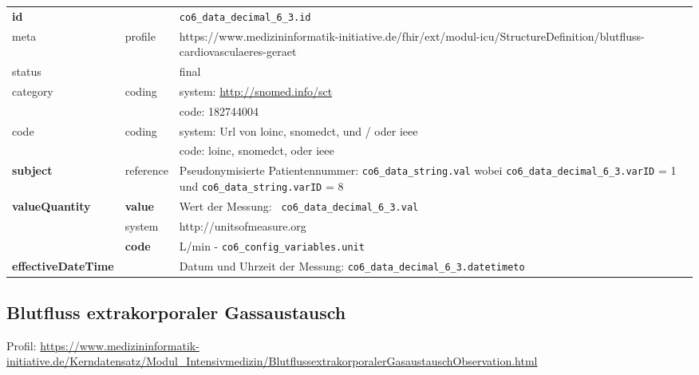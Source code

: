 \begin{longtable}{|l|l|p{7.5cm}|}
        \hline
        \rowcolor{lightgray} \multicolumn{3}{|l|}{Data Mapping (inhaltlich)} \\ \hline
        \textbf{id} &  & \texttt{co6\_data\_decimal\_6\_3.id} \\ \hline
	meta & profile & https://www.medizininformatik-initiative.de/fhir/ext/modul-icu/StructureDefinition/blutfluss-cardiovasculaeres-geraet \\ \hline 
	status &  & final   \\ \hline 
	category & coding & system: \url{http://snomed.info/sct} \\
\cline{3-3}
	& & code: 182744004 \\ \hline
	code & coding & system: Url von \ac{loinc}, \ac{snomedct}, und / oder \ac{ieee} \\ 
	\cline{3-3} 
	 &  & code: \ac{loinc}, \ac{snomedct}, oder \ac{ieee} \\ \hline
	 \textbf{subject} & reference & Pseudonymisierte Patientennummer: \texttt{co6\_data\_string.val} wobei \texttt{co6\_data\_decimal\_6\_3.varID} = 1 und \texttt{co6\_data\_string.varID} = 8 \\ \hline
	 \textbf{valueQuantity}  & \textbf{value} & Wert der Messung: \texttt{
co6\_data\_decimal\_6\_3.val} \\
        \cline{2-3}
         & system & http://unitsofmeasure.org \\
         \cline{2-3}
         & \textbf{code} & L/min - \texttt{co6\_config\_variables.unit}
\\ \hline
     \textbf{effectiveDateTime}  & & Datum und Uhrzeit der Messung: \texttt{co6\_data\_decimal\_6\_3.datetimeto} \\
     \hline
\end{longtable}


\subsection{Blutfluss extrakorporaler Gassaustausch} 

Profil: \url{https://www.medizininformatik-initiative.de/Kerndatensatz/Modul_Intensivmedizin/BlutflussextrakorporalerGasaustauschObservation.html}

